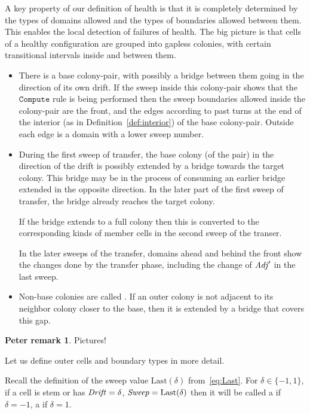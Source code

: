 \documentclass[11pt]{memoir}
\newcommand{\authnote}[3]
{\text{{ \textcolor{#3}{\( \langle\hspace{-0.2em}\langle \)\textsf{\footnotesize #1: #2}\( \rangle\hspace{-0.2em}\rangle \)}}}}
\newcommand{\authnote}[2]{}
\newcommand{\Pnote}[1]{{\authnote{P}{#1}{cyan}}}
\theoremstyle{definition} %
\newtheorem{Premark}{\color{cyan}Peter remark}
\newenvironment{premark}{\begin{Premark}\color{cyan}}{\varqed\end{Premark}}
\renewcommand{\Pnote}[1]{\begin{premark}#1\end{premark}}
\newcommand{\fld}[1]{\ensuremath{\textit{#1\/}}}
\newcommand{\rul}[1]{\ensuremath{\texttt{#1}}}
\newcommand{\Drift}{\fld{Drift}}
\newcommand{\Adj}{\fld{Adj}}
\newcommand{\Sweep}{\fld{Sweep}}
\newcommand{\Last}{\mathrm{Last}}
\newcommand{\Comp}{\rul{Compute}}
\begin{document}
A key property of our definition of health is that it is completely determined by the
types of domains allowed and the types of boundaries allowed between them.
This enables the local detection of failures of health.
The big picture is that cells of a healthy configuration are grouped into gapless colonies, with
certain transitional intervals inside and between them.
\begin{itemize}
\item There is a base colony-pair, with possibly a bridge between them going in the direction
  of its own drift.
  If the sweep inside this colony-pair shows that the \( \Comp \) rule is being performed then
  the sweep boundaries allowed inside the colony-pair are the front, and the edges
  according to past turns at the end of the interior (as in Definition~\ref{def:interior})
  of the base colony-pair.
  Outside each edge is a domain with a lower sweep number.

\item  During the first sweep of transfer, the base colony (of the pair)
  in the direction of the drift is possibly extended by a bridge towards the target colony.
  This bridge may be in the process of consuming an earlier bridge extended in the opposite direction.
  In the later part of the first sweep of transfer, the bridge already reaches
  the target colony.

  If the bridge extends to a full colony then this is converted to the corresponding kinds of member
  cells in the second sweep of the transer.

  In the later sweeps of the transfer, domains ahead and behind the front show the changes done
  by the transfer phase, including the change of \( \Adj' \) in the last sweep.
  
\item Non-base colonies are called .
If an outer colony is not adjacent to its neighbor colony closer to the base,
then it is extended by a bridge that covers this gap.

\end{itemize}
\Pnote{Pictures!}

Let us define outer cells and boundary types in more detail.

\begin{definition}\label{def:outer-cells}
    Recall the definition of the sweep value  \(  \Last(\delta)  \)  from~\eqref{eq:Last}.
    For \( \delta \in \{ -1,1 \} \), if a cell is stem or has
\( \Drift = \delta \),  \( \Sweep = \Last(\delta) \)
    then it will be called a  if
    \( \delta = -1 \), a  if \( \delta = 1 \).
\end{definition}
\end{document}

